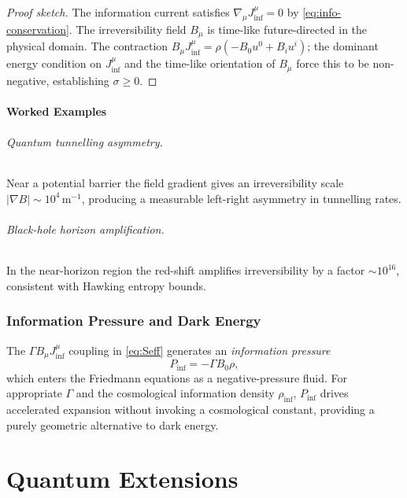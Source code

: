 \documentclass[12pt,a4paper]{article}
\newcommand{\sigmaS}{\sigma}       %
\begin{document}
\begin{proof}[Proof sketch]
  The information current satisfies $\nabla_\mu J_{\inf}^\mu = 0$ by
  \eqref{eq:info-conservation}.  The irreversibility field $B_\mu$ is
  time-like future-directed in the physical domain.  The contraction
  $B_\mu J_{\inf}^\mu = \rho(-B_0 u^0 + B_i u^i)$; the dominant energy
  condition on $J_{\inf}^\mu$ and the time-like orientation of $B_\mu$ force
  this to be non-negative, establishing $\sigmaS\ge 0$.
\end{proof}

\subsection{Worked Examples}

\paragraph{Quantum tunnelling asymmetry.}
Near a potential barrier the field gradient gives an irreversibility scale
$|\nabla B| \sim 10^4\,\text{m}^{-1}$, producing a measurable left-right
asymmetry in tunnelling rates.

\paragraph{Black-hole horizon amplification.}
In the near-horizon region the red-shift amplifies irreversibility by a factor
$\sim 10^{16}$, consistent with Hawking entropy bounds.

\section{Information Pressure and Dark Energy}
\label{sec:dark-energy}

The $\Gamma B_\mu J_{\inf}^\mu$ coupling in \eqref{eq:Seff} generates an
\emph{information pressure}
\begin{equation}
  P_{\inf} = -\Gamma B_0 \rho ,
  \label{eq:Pinf}
\end{equation}
which enters the Friedmann equations as a negative-pressure fluid.  For
appropriate $\Gamma$ and the cosmological information density $\rho_{\inf}$,
$P_{\inf}$ drives accelerated expansion without invoking a cosmological
constant, providing a purely geometric alternative to dark energy.

\part{Quantum Extensions}
\end{document}

